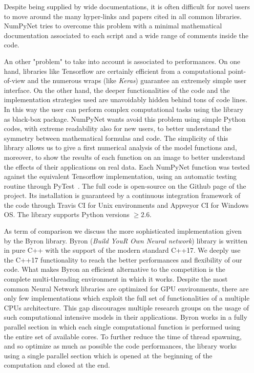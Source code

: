 \documentclass[12pt,a4paper]{report}
\begin{document}
Despite being supplied by wide documentations, it is often difficult for novel users to move around the many hyper-links and papers cited in all common libraries.
\textsf{NumPyNet} tries to overcome this problem with a minimal mathematical documentation associated to each script and a wide range of comments inside the code.

An other "problem" to take into account is associated to performances.
On one hand, libraries like \textsf{Tensorflow} are certainly efficient from a computational point-of-view and the numerous wraps (like \emph{Keras}) guarantee an extremely simple user interface.
On the other hand, the deeper functionalities of the code and the implementation strategies used are unavoidably hidden behind tons of code lines.
In this way the user can perform complex computational tasks using the library as black-box package.
\textsf{NumPyNet} wants avoid this problem using simple \textsf{Python} codes, with extreme readability also for new users, to better understand the symmetry between mathematical formulas and code.
The simplicity of this library allows us to give a first numerical analysis of the model functions and, moreover, to show the results of each function on an image to better understand the effects of their applications on real data.
Each \textsf{NumPyNet} function was tested against the equivalent \textsf{Tensorflow} implementation, using an automatic testing routine through \textsf{PyTest}~\cite{PyTest}.
The full code is open-source on the \textsf{Github} page of the project.
Its installation is guaranteed by a continuous integration framework of the code through \textsf{Travis CI} for Unix environments and \textsf{Appveyor CI} for Windows OS.
The library supports \textsf{Python} versions $\ge2.6$.

As term of comparison we discuss the more sophisticated implementation given by the \textsf{Byron} library.
\textsf{Byron} (\emph{Build YouR Own Neural network}) library is written in pure \textsf{C++} with the support of the modern standard \textsf{C++17}.
We deeply use the \textsf{C++17} functionality to reach the better performances and flexibility of our code.
What makes \textsf{Byron} an efficient alternative to the competition is the complete multi-threading environment in which it works.
Despite the most common Neural Network libraries are optimized for GPU environments, there are only few implementations which exploit the full set of functionalities of a multiple CPUs architecture.
This gap discourages multiple research groups on the usage of such computational intensive models in their applications.
\textsf{Byron} works in a fully parallel section in which each single computational function is performed using the entire set of available cores.
To further reduce the time of thread spawning, and so optimize as much as possible the code performances, the library works using a single parallel section which is opened at the beginning of the computation and closed at the end.
\end{document}
